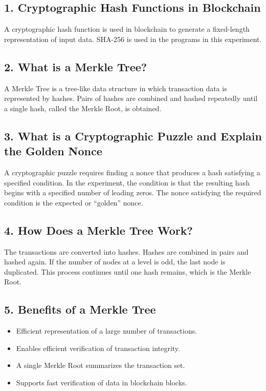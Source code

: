 \documentclass[12pt,a4paper]{article}
\begin{document}
\subsection{1. Cryptographic Hash Functions in Blockchain}
A cryptographic hash function is used in blockchain to generate a fixed-length representation of input data. SHA-256 is used in the programs in this experiment.

\subsection{2. What is a Merkle Tree?}
A Merkle Tree is a tree-like data structure in which transaction data is represented by hashes. Pairs of hashes are combined and hashed repeatedly until a single hash, called the Merkle Root, is obtained.

\subsection{3. What is a Cryptographic Puzzle and Explain the Golden Nonce}
A cryptographic puzzle requires finding a nonce that produces a hash satisfying a specified condition. In the experiment, the condition is that the resulting hash begins with a specified number of leading zeros. The nonce satisfying the required condition is the expected or ``golden'' nonce.

\subsection{4. How Does a Merkle Tree Work?}
The transactions are converted into hashes. Hashes are combined in pairs and hashed again. If the number of nodes at a level is odd, the last node is duplicated. This process continues until one hash remains, which is the Merkle Root.

\subsection{5. Benefits of a Merkle Tree}
\begin{itemize}
    \item Efficient representation of a large number of transactions.
    \item Enables efficient verification of transaction integrity.
    \item A single Merkle Root summarizes the transaction set.
    \item Supports fast verification of data in blockchain blocks.
\end{itemize}
\end{document}
